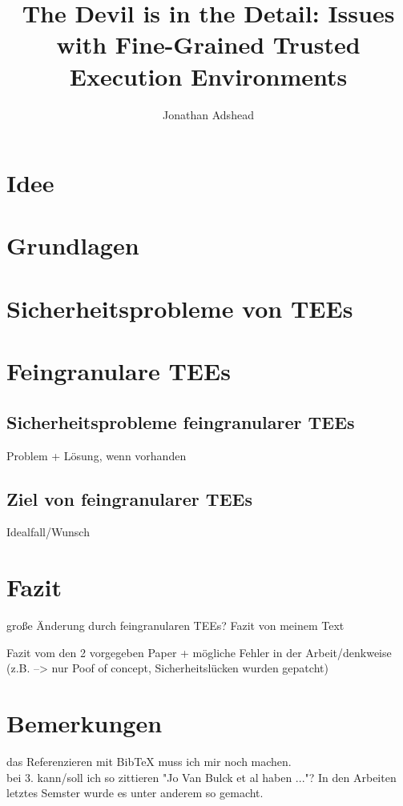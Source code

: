\documentclass[sigconf]{acmart}
\title{The Devil is in the Detail: Issues with Fine-Grained Trusted Execution Environments}
\author{Jonathan Adshead}
\affiliation{
    \institution{Friedricht-Alexander-Universität Erlangen-Nürnberg}
    \country{}}
\begin{document}
\maketitle  %




\section{Idee}



\section{Grundlagen}



\section{Sicherheitsprobleme von TEEs}



\section{Feingranulare TEEs}



\subsection{Sicherheitsprobleme feingranularer TEEs}
Problem + Lösung, wenn vorhanden

\subsection{Ziel von feingranularer TEEs}
Idealfall/Wunsch

\section{Fazit} 

große Änderung durch feingranularen TEEs?
Fazit von meinem Text

Fazit vom den 2 vorgegeben Paper + mögliche Fehler in der Arbeit/denkweise (z.B. --> nur Poof of concept, Sicherheitslücken wurden gepatcht)









\section*{Bemerkungen}
das Referenzieren mit BibTeX muss ich mir noch machen.\\
bei 3. kann/soll ich so zittieren "Jo Van Bulck et al haben ..."? In den Arbeiten letztes Semster wurde es unter anderem so gemacht.
\\
\end{document}
